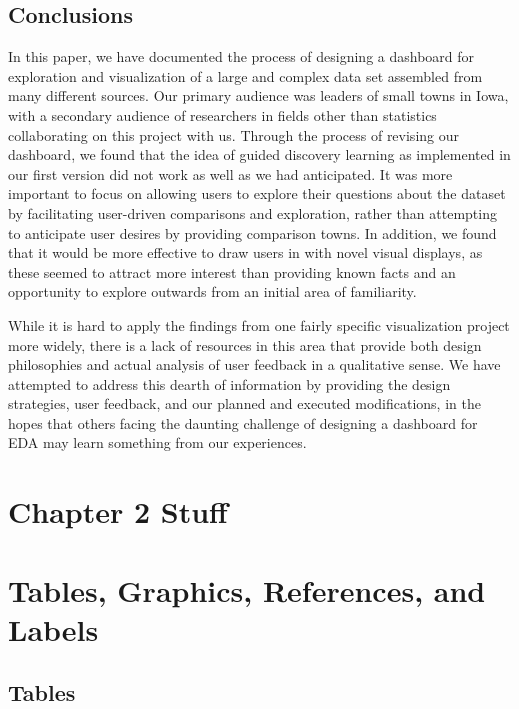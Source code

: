\documentclass[print]{nuthesis}
\begin{document}
\hypertarget{conclusions}{%
\section{Conclusions}\label{conclusions}}

In this paper, we have documented the process of designing a dashboard for exploration and visualization of a large and complex data set assembled from many different sources. Our primary audience was leaders of small towns in Iowa, with a secondary audience of researchers in fields other than statistics collaborating on this project with us. Through the process of revising our dashboard, we found that the idea of guided discovery learning as implemented in our first version did not work as well as we had anticipated. It was more important to focus on allowing users to explore their questions about the dataset by facilitating user-driven comparisons and exploration, rather than attempting to anticipate user desires by providing comparison towns. In addition, we found that it would be more effective to draw users in with novel visual displays, as these seemed to attract more interest than providing known facts and an opportunity to explore outwards from an initial area of familiarity.

While it is hard to apply the findings from one fairly specific visualization project more widely, there is a lack of resources in this area that provide both design philosophies and actual analysis of user feedback in a qualitative sense. We have attempted to address this dearth of information by providing the design strategies, user feedback, and our planned and executed modifications, in the hopes that others facing the daunting challenge of designing a dashboard for EDA may learn something from our experiences.

\hypertarget{math-sci}{%
\chapter{Chapter 2 Stuff}\label{math-sci}}

\hypertarget{ref-labels}{%
\chapter{Tables, Graphics, References, and Labels}\label{ref-labels}}

\hypertarget{tables}{%
\section{Tables}\label{tables}}
\end{document}
